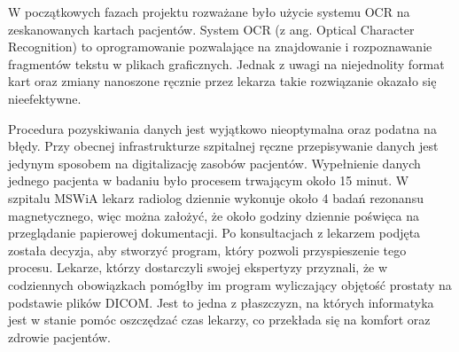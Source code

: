 \documentclass[a4paper,11pt,twoside]{report}
\theoremstyle{definition}
\begin{document}
\par
W początkowych fazach projektu rozważane było użycie systemu OCR na zeskanowanych kartach pacjentów. System OCR (z ang. Optical Character Recognition) to oprogramowanie pozwalające na znajdowanie i rozpoznawanie fragmentów tekstu w plikach graficznych. Jednak z uwagi na niejednolity format kart oraz zmiany nanoszone ręcznie przez lekarza takie rozwiązanie okazało się nieefektywne.
\par
Procedura pozyskiwania danych jest wyjątkowo nieoptymalna oraz podatna na błędy. Przy obecnej infrastrukturze szpitalnej ręczne przepisywanie danych jest jedynym sposobem na digitalizację zasobów pacjentów. Wypełnienie danych jednego pacjenta w badaniu było procesem trwającym około 15 minut. W szpitalu MSWiA lekarz radiolog dziennie wykonuje około 4 badań rezonansu magnetycznego, więc można założyć, że około godziny dziennie poświęca na przeglądanie papierowej dokumentacji. Po konsultacjach z lekarzem podjęta została decyzja, aby stworzyć program, który pozwoli przyspieszenie tego procesu. Lekarze, którzy dostarczyli swojej ekspertyzy przyznali, że w codziennych obowiązkach pomógłby im program wyliczający objętość prostaty na podstawie plików DICOM. Jest to jedna z płaszczyzn, na których informatyka jest w stanie pomóc oszczędzać czas lekarzy, co przekłada się na komfort oraz zdrowie pacjentów.
\par
\end{document}
